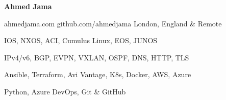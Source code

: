 \documentclass[11pt]{article} %
\begin{document}
\centerline{{\Huge \bf Ahmed Jama}}

\bigskip

        {ahmedjama.com}
        {github.com/ahmedjama}
        {London, England \& Remote}


      {IOS, NXOS, ACI, Cumulus Linux, EOS, JUNOS}
      
      {IPv4/v6, BGP, EVPN, VXLAN, OSPF, DNS, HTTP, TLS}

      {Ansible, Terraform, Avi Vantage, K8s, Docker, AWS, Azure}

      {Python, Azure DevOps, Git \& GitHub}



\end{document}
